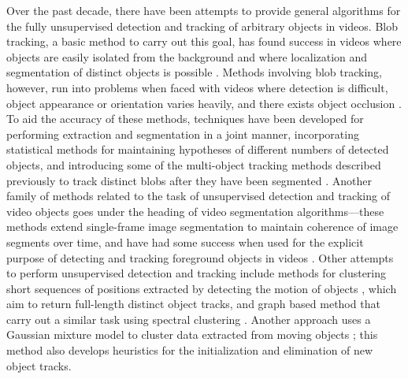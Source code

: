 \documentclass{article}
\begin{document}
Over the past decade, there have been attempts to provide general algorithms for the fully unsupervised detection and tracking of arbitrary objects in videos. Blob tracking, a basic method to carry out this goal, has found success in videos where objects are easily isolated from the background and where localization and segmentation of distinct objects is possible \cite{francois2004real, isard_2001}. Methods involving blob tracking, however, run into problems when faced with videos where detection is difficult, object appearance or orientation varies heavily, and there exists object occlusion \cite{song2005model}. To aid the accuracy of these methods, techniques have been developed for performing extraction and segmentation in a joint manner, incorporating statistical methods for maintaining hypotheses of different numbers of detected objects, and introducing some of the multi-object tracking methods described previously to track distinct blobs after they have been segmented \cite{collins2003mean, isard_2001}. Another family of methods related to the task of unsupervised detection and tracking of video objects goes under the heading of video segmentation algorithms---these methods extend single-frame image segmentation to maintain coherence of image segments over time, and have had some success when used for the explicit purpose of detecting and tracking foreground objects in videos \cite{brox2003unsupervised, sista2000unsupervised, wang1998unsupervised}. Other attempts to perform unsupervised detection and tracking include methods for clustering short sequences of positions extracted by detecting the motion of objects \cite{brostow2006unsupervised, brox2010object}, which aim to return full-length distinct object tracks, and graph based method that carry out a similar task using spectral clustering \cite{fragkiadaki2011detection}. Another approach uses a Gaussian mixture model to cluster data extracted from moving objects \cite{pece_2002}; this method also develops heuristics for the initialization and elimination of new object tracks. 
\end{document}
